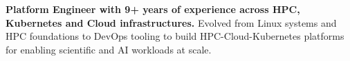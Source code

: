 
\begin{cventries}
\cventry
{} %
{} %
{} %
{} %
{ %
	\begin{cvitems}
        \textbf{Platform Engineer with 9+ years of experience across HPC, Kubernetes and Cloud infrastructures.} Evolved from Linux systems and HPC foundations to DevOps tooling to build HPC-Cloud-Kubernetes platforms for enabling scientific and AI workloads at scale.
	\end{cvitems}
}
\end{cventries}



